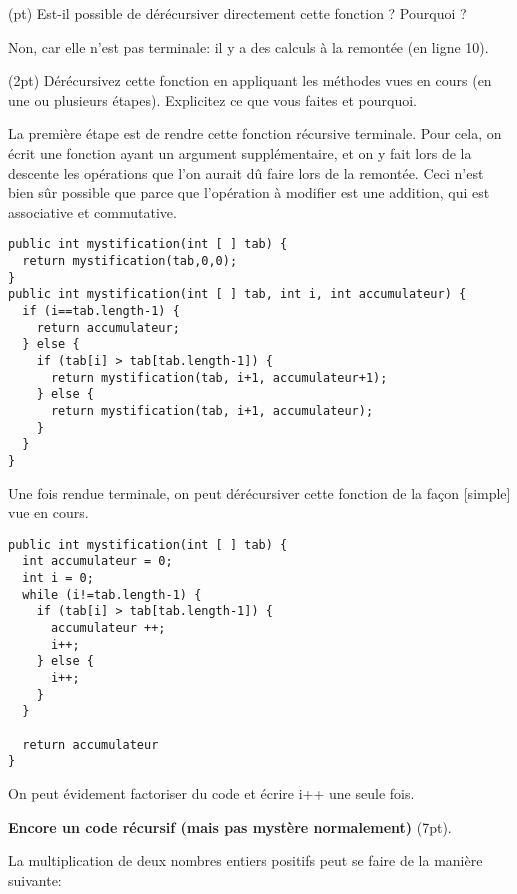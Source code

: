 \documentclass[10pt]{article}\usepackage[correction,nu]{esial}
\begin{document}
\Question(\textonehalf pt) Est-il possible de dérécursiver directement cette
fonction ? Pourquoi ? 

\begin{Reponse}
  Non, car elle n'est pas terminale: il y a des calculs à la remontée (en ligne
  10). 
\end{Reponse}

\Question(2pt) Dérécursivez cette fonction en appliquant les méthodes vues en
cours (en une ou plusieurs étapes). Explicitez ce que vous faites et pourquoi.

\begin{Reponse}
  La première étape est de rendre cette fonction récursive terminale. Pour
  cela, on écrit une fonction ayant un argument supplémentaire, et on y fait
  lors de la descente les opérations que l'on aurait dû faire lors de la
  remontée. Ceci n'est bien sûr possible que parce que l'opération à modifier
  est une addition, qui est associative et commutative.

  \begin{Verbatim}
public int mystification(int [ ] tab) {
  return mystification(tab,0,0);
}
public int mystification(int [ ] tab, int i, int accumulateur) {
  if (i==tab.length-1) {
    return accumulateur;
  } else {
    if (tab[i] > tab[tab.length-1]) {
      return mystification(tab, i+1, accumulateur+1);
    } else {
      return mystification(tab, i+1, accumulateur);
    }
  }
}
  \end{Verbatim}

Une fois rendue terminale, on peut dérécursiver cette fonction de la façon
[simple] vue en cours.

  \begin{Verbatim}
public int mystification(int [ ] tab) {
  int accumulateur = 0;
  int i = 0;
  while (i!=tab.length-1) {
    if (tab[i] > tab[tab.length-1]) {
      accumulateur ++;
      i++;
    } else {
      i++;
    }
  }

  return accumulateur
}
  \end{Verbatim}

  On peut évidement factoriser du code et écrire i++ une seule fois.
\end{Reponse}

\bigskip\Exercice\textbf{Encore un code récursif (mais pas mystère
  normalement)} (7pt). 

\noindent La multiplication de deux nombres entiers positifs peut se faire de
la manière suivante:
\end{document}
